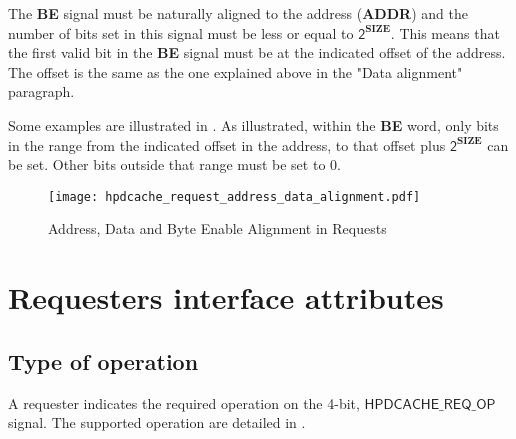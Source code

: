 \documentclass[10pt,titlepage,twoside]{book}
\begin{document}
The \textbf{BE} signal must be naturally aligned to the address (\textbf{ADDR}) and the number of bits set in this signal must be less or equal to $\mathsf{2^\mathbf{SIZE}}$.
This means that the first valid bit in the \textbf{BE} signal must be at the indicated offset of the address.
The offset is the same as the one explained above in the "Data alignment" paragraph.

Some examples are illustrated in .
As illustrated, within the \textbf{BE} word, only bits in the range from the indicated offset in the address, to that offset plus $\mathsf{2^\mathbf{SIZE}}$ can be set.
Other bits outside that range must be set to 0.

\begin{figure}[tbp]
    \centering
    \texttt{[image: hpdcache\_request\_address\_data\_alignment.pdf]}
    \caption{Address, Data and Byte Enable Alignment in Requests}
\end{figure}


\clearpage
\section{Requesters interface attributes}%

\subsection{Type of operation}%

A requester indicates the required operation on the 4-bit, $\mathsf{HPDCACHE\_REQ\_OP}$ signal.
The supported operation are detailed in .
\end{document}
